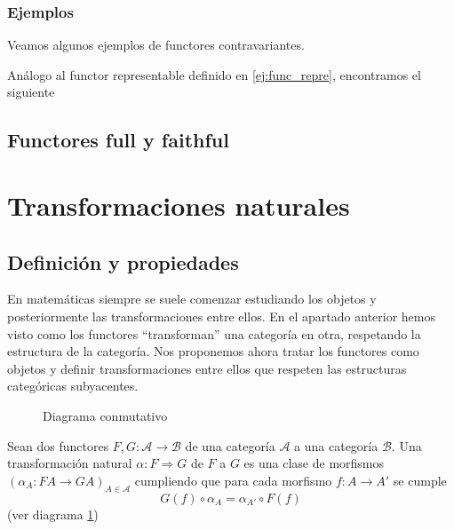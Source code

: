 \subsubsection{Ejemplos}

Veamos algunos ejemplos de functores contravariantes.

\begin{ejemplo}
    Análogo al functor representable definido en \ref{ej:func_repre}, encontramos el siguiente 
\end{ejemplo}

\subsection{Functores full y faithful}

\section{Transformaciones naturales}
\subsection{Definición y propiedades}
En matemáticas siempre se suele comenzar estudiando los objetos y posteriormente las transformaciones entre ellos. En el apartado anterior hemos visto como los functores ``transforman'' una categoría en otra, respetando la estructura de la categoría. Nos proponemos ahora tratar los functores como objetos y definir transformaciones entre ellos que respeten las estructuras categóricas subyacentes. 

\begin{figure}[htpb]
    \centering
    \caption{Diagrama conmutativo}
    \label{diag:trans_natural}
\end{figure}

\begin{definicion}
    Sean dos functores $F,G: \mathscr{A} \longrightarrow \mathscr{B}$ de una categoría $\mathscr{A}$ a una categoría $\mathscr{B}$. Una transformación natural $\alpha: F \Rightarrow G$ de $F$ a $G$ es una clase de morfismos $(\alpha_A:FA \longrightarrow GA)_{A\in \mathscr{A}}$ cumpliendo que para cada morfismo $f: A \longrightarrow A'$ se cumple \begin{equation}
        G(f) \circ \alpha_{A} = \alpha_{A'} \circ F(f)
    \end{equation}
    (ver diagrama \ref{diag:trans_natural})
    \label{t_natural}
\end{definicion}

